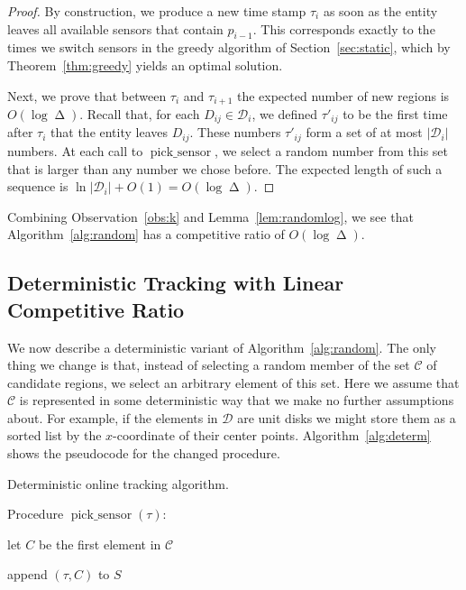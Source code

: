 \documentclass[runningheads]{llncs}
\newcommand {\script} [1] {\ensuremath {\mathcal {#1}}}
\DeclareMathOperator {\ply}{\Delta}
\DeclareMathOperator {\picksensor}{pick\_sensor}
\begin{document}
      \begin {proof}
        By construction, we produce a new time stamp $\tau_i$ as soon as the entity leaves all available sensors that contain $p_{i-1}$. This corresponds exactly to the times we switch sensors in the greedy algorithm of Section~\ref {sec:static}, which by Theorem~\ref {thm:greedy} yields an optimal solution.
        
        Next, we prove that between $\tau_i$ and $\tau_{i+1}$ the expected number of new regions is $O (\log \ply)$.
        Recall that, for each $D_{ij} \in \script D_i$, we defined $\tau'_{ij}$ to be the first time after $\tau_i$ that the entity leaves $D_{ij}$.
        These numbers $\tau'_{ij}$ form a set of at most $|\script D_i|$ numbers. At each call to $\picksensor$, we select a random number from this set that is larger than any number we chose before.
        The expected length of such a sequence is $\ln |\script D_i| +O(1)=O(\log \ply)$.
      \end {proof}

      Combining Observation~\ref {obs:k} and Lemma~\ref {lem:randomlog}, we see
      that Algorithm~\ref {alg:random} has a competitive ratio of $O (\log \ply)$.

    \subsection {Deterministic Tracking with Linear Competitive Ratio}
      We now describe a deterministic variant of Algorithm~\ref {alg:random}. The only thing we change is
 that, instead of selecting a random member of the set $\script C$ of candidate regions, we select an arbitrary element of this set.   Here we assume that $\script C$ is represented in some deterministic way that we make no further assumptions about. For example, if the elements in $\script D$ are unit disks we might store them as a sorted list by the $x$-coordinate of their center points. Algorithm~\ref {alg:determ}  shows the pseudocode for the changed procedure.
         
      \begin {algorithm} [ht]
        \caption {Deterministic online tracking algorithm.} \label {alg:determ}
        Procedure $\picksensor (\tau)$:
        \begin {compactenum}
          \item let $C$ be the first element in $\script C$
          \item append $(\tau, C)$ to $S$
        \end {compactenum}
      \end{algorithm}
         
\end{document}
